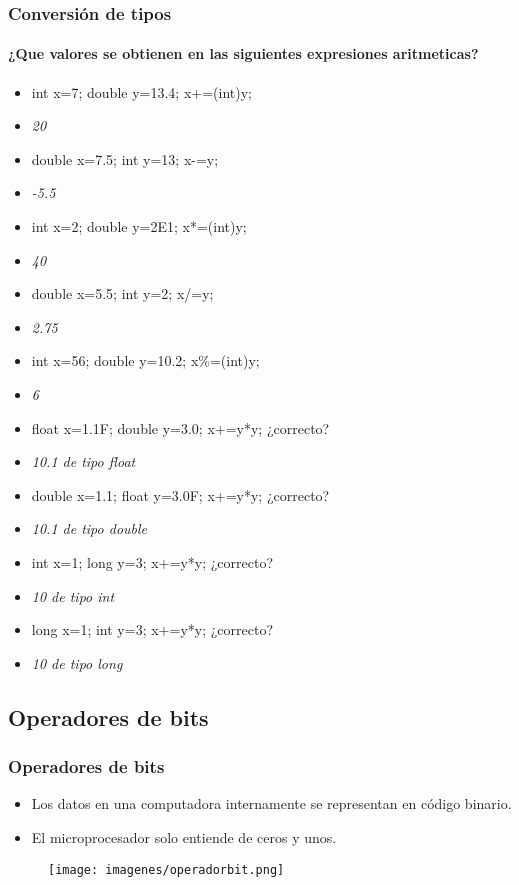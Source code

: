 \documentclass{beamer}
\begin{document}
\begin{frame}
\frametitle{Conversión de tipos}
\framesubtitle{¿Que valores se obtienen en las siguientes expresiones aritmeticas?}
\begin{footnotesize}
\begin{itemize}[<+->]
\item int x=7; double y=13.4; x+=(int)y;
\item \emph{20} 
\item double x=7.5; int y=13; x-=y;
\item \emph{-5.5}
\item int x=2; double y=2E1; x*=(int)y;
\item \emph{40}
\item double x=5.5; int y=2; x/=y;
\item \emph{2.75}
\item int x=56; double y=10.2; x\%=(int)y;
\item \emph{6}
\item float x=1.1F; double y=3.0; x+=y*y; ¿correcto?
\item \emph{10.1 de tipo float}
\item double x=1.1; float y=3.0F; x+=y*y; ¿correcto?
\item \emph{10.1 de tipo double}
\item int x=1; long y=3; x+=y*y; ¿correcto?
\item \emph{10 de tipo int}
\item long x=1; int y=3; x+=y*y; ¿correcto?
\item \emph{10 de tipo long}
\end{itemize}
\end{footnotesize}
\end{frame}


\subsection{Operadores de bits}
\begin{frame}
\frametitle{Operadores de bits}
\begin{itemize}[<+-| alert@+>]
\item Los datos en una computadora internamente se representan en código binario.
\item El microprocesador solo entiende de ceros y unos.
\end{itemize}
\begin{figure}
\texttt{[image: imagenes/operadorbit.png]}
\end{figure}
\end{frame}
\end{document}
